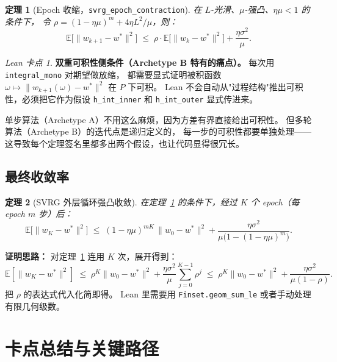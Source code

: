 \documentclass[11pt]{article}
\newtheorem{theorem}{定理}[section]
\theoremstyle{remark}
\newtheorem*{leanremark}{Lean 卡点}
\begin{document}
\begin{theorem}[Epoch 收缩，\texttt{svrg\_epoch\_contraction}]
  \label{thm:epoch-contraction}
  在 $L$-光滑、$\mu$-强凸、$\eta\mu < 1$ 的条件下，
  令 $\rho = (1-\eta\mu)^m + 4\eta L^2/\mu$，则：
  \[
    \mathbb{E}\bigl[\|w_{k+1} - w^*\|^2\bigr]
    \;\leq\;
    \rho \cdot \mathbb{E}\bigl[\|w_k - w^*\|^2\bigr]
    + \frac{\eta\sigma^2}{\mu}.
  \]
\end{theorem}

\begin{leanremark}
  \textbf{双重可积性侧条件（Archetype B 特有的痛点）。}
  每次用 \texttt{integral\_mono} 对期望做放缩，
  都需要显式证明被积函数 $\omega \mapsto \|w_{k+1}(\omega) - w^*\|^2$ 在 $P$ 下可积。
  Lean 不会自动从"过程结构"推出可积性，必须把它作为假设
  \texttt{h\_int\_inner} 和 \texttt{h\_int\_outer} 显式传进来。

  单步算法（Archetype A）不用这么麻烦，因为方差有界直接给出可积性。
  但多轮算法（Archetype B）的迭代点是递归定义的，
  每一步的可积性都要单独处理——
  这导致每个定理签名里都多出两个假设，也让代码显得很冗长。
\end{leanremark}

\subsection{最终收敛率}

\begin{theorem}[SVRG 外层循环强凸收敛]
  \label{thm:outer-convergence}
  在定理~\ref{thm:epoch-contraction} 的条件下，经过 $K$ 个 epoch（每 epoch $m$ 步）后：
  \[
    \mathbb{E}\bigl[\|w_K - w^*\|^2\bigr]
    \;\leq\;
    (1-\eta\mu)^{mK}\,\|w_0 - w^*\|^2
    + \frac{\eta\sigma^2}{\mu\bigl(1 - (1-\eta\mu)^m\bigr)}.
  \]
\end{theorem}

\noindent\textbf{证明思路：}
对定理~\ref{thm:epoch-contraction} 连用 $K$ 次，展开得到：
\[
  \mathbb{E}[\|w_K - w^*\|^2]
  \;\leq\;
  \rho^K \|w_0 - w^*\|^2
  + \frac{\eta\sigma^2}{\mu} \sum_{j=0}^{K-1} \rho^j
  \;\leq\;
  \rho^K \|w_0 - w^*\|^2
  + \frac{\eta\sigma^2}{\mu(1-\rho)}.
\]
把 $\rho$ 的表达式代入化简即得。
Lean 里需要用 \texttt{Finset.geom\_sum\_le} 或者手动处理有限几何级数。

\section{卡点总结与关键路径}
\end{document}
